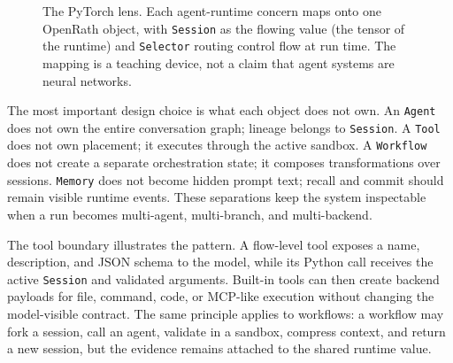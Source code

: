 \begin{figure}[!htbp]
\centering
{}
\caption{The PyTorch lens. Each agent-runtime concern maps onto one OpenRath
object, with \texttt{Session} as the flowing value (the tensor of the runtime)
and \texttt{Selector} routing control flow at run time. The mapping is a
teaching device, not a claim that agent systems are neural networks.}
\label{fig:pytorch-lens}
\end{figure}

The most important design choice is what each object does not own. An
\texttt{Agent} does not own the entire conversation graph; lineage belongs to
\texttt{Session}. A \texttt{Tool} does not own placement; it executes through
the active sandbox. A \texttt{Workflow} does not create a separate orchestration
state; it composes transformations over sessions. \texttt{Memory} does not
become hidden prompt text; recall and commit should remain visible runtime
events. These separations keep the system inspectable when a run becomes
multi-agent, multi-branch, and multi-backend.

The tool boundary illustrates the pattern. A flow-level tool exposes a name,
description, and JSON schema to the model, while its Python call receives the
active \texttt{Session} and validated arguments. Built-in tools can then create
backend payloads for file, command, code, or MCP-like execution without changing
the model-visible contract. The same principle applies to workflows: a workflow
may fork a session, call an agent, validate in a sandbox, compress context, and
return a new session, but the evidence remains attached to the shared runtime
value.


